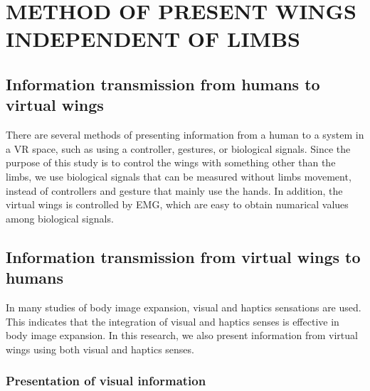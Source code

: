 \documentclass[letterpaper, 10 pt, conference]{ieeeconf}  %
\begin{document}
\section{METHOD OF PRESENT WINGS INDEPENDENT OF LIMBS}
        
        \subsection{Information transmission from humans to virtual wings}
                There are several methods of presenting information from a human to a system in a VR space, such as using a controller, gestures, or biological signals.
                Since the purpose of this study is to control the wings with something other than the limbs, we use biological signals that can be measured without limbs movement, instead of controllers and gesture that mainly use the hands. 
                In addition, the virtual  wings is controlled by EMG, which are easy to obtain numarical values among biological signals.

        \subsection{Information transmission from virtual wings to humans}
                In many studies of body image expansion, visual and haptics sensations are used.  
                This indicates that the integration of visual and haptics senses is effective in body image expansion. 
                In this research, we also present information from virtual wings using both visual and haptics senses.  

                \subsubsection{Presentation of visual information}
                
\end{document}

